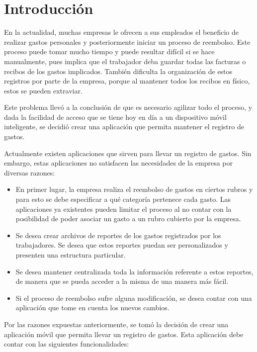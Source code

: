 \chapter*{Introducción} \label{sec:Introduccion}

\vspace{5 mm}
En la actualidad, muchas empresas le ofrecen a sus empleados el beneficio de realizar gastos personales y posteriormente iniciar un proceso de reembolso. Este proceso puede tomar mucho tiempo y puede resultar difícil si se hace manualmente, pues implica que el trabajador deba guardar todas las facturas o recibos de los gastos implicados. También dificulta la organización de estos registros por parte de la empresa, porque al mantener todos los recibos en físico, estos se pueden extraviar.

Este problema llevó a la conclusión de que es necesario agilizar todo el proceso, y dada la facilidad de acceso que se tiene hoy en día a un dispositivo móvil inteligente, se decidió crear una aplicación que permita mantener el registro de gastos. 

Actualmente existen aplicaciones que sirven para llevar un registro de gastos. Sin embargo, estas aplicaciones no satisfacen las necesidades de la empresa por diversas razones:

\begin{itemize}
\item En primer lugar, la empresa realiza el reembolso de gastos en ciertos rubros y para esto se debe especificar a qué categoría pertenece cada gasto. Las aplicaciones ya existentes pueden limitar el proceso al no contar con la posibilidad de poder asociar un gasto a un rubro cubierto por la empresa.
\item Se desea crear archivos de reportes de los gastos registrados por los trabajadores. Se desea que estos reportes puedan ser personalizados y presenten una estructura particular.
\item Se desea mantener centralizada toda la información referente a estos reportes, de manera que se pueda acceder a la misma de una manera más fácil.
\item Si el proceso de reembolso sufre alguna modificación, se desea contar con una aplicación que tome en cuenta los nuevos cambios.
\end{itemize}

Por las razones expuestas anteriormente, se tomó la decisión de crear una aplicación móvil que permita llevar un registro de gastos. Esta aplicación debe contar con las siguientes funcionalidades:

